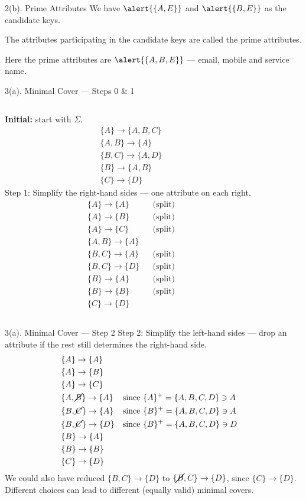 \documentclass{beamer}
\newcommand\fd[2]{\{#1\} \rightarrow \{#2\}}
\newcommand\cl[1]{\{#1\}^+}
\begin{document}
\begin{frame}{2(b). Prime Attributes}
\vfill
We have $\alert{\{A,E\}}$ and $\alert{\{B,E\}}$ as the \alert{candidate keys}.
\bigskip

\pause
The attributes participating in the candidate keys are called the \alert{prime attributes}.
\bigskip

\pause
Here the prime attributes are $\alert{\{A, B, E\}}$ --- email, mobile and service name.
\vfill
\end{frame}

\begin{frame}{3(a). Minimal Cover --- Steps 0 \& 1}
\small
\begin{columns}[t,onlytextwidth]
\textbf{Initial:} start with $\Sigma$.
\[
\begin{aligned}
&\fd{A}{A,B,C}\\
&\fd{A,B}{A}\\
&\fd{B,C}{A,D}\\
&\fd{B}{A,B}\\
&\fd{C}{D}
\end{aligned}
\]
\pause
{}
\alert{Step 1: Simplify the right-hand sides} --- one attribute on each right.
\[
\begin{aligned}
&\fd{A}{A} && \text{(split)}\\
&\fd{A}{B} && \text{(split)}\\
&\fd{A}{C} && \text{(split)}\\
&\fd{A,B}{A}\\
&\fd{B,C}{A} && \text{(split)}\\
&\fd{B,C}{D} && \text{(split)}\\
&\fd{B}{A} && \text{(split)}\\
&\fd{B}{B} && \text{(split)}\\
&\fd{C}{D}
\end{aligned}
\]
\end{columns}
\end{frame}

\begin{frame}{3(a). Minimal Cover --- Step 2}
\small
\alert{Step 2: Simplify the left-hand sides} --- drop an attribute if the rest still determines the right-hand side.
\[
\begin{aligned}
&\fd{A}{A}\\
&\fd{A}{B}\\
&\fd{A}{C}\\
&\{A, \cancel{B}\} \rightarrow \{A\} && \text{since } \cl{A} = \{A,B,C,D\} \ni A\\
&\{B, \cancel{C}\} \rightarrow \{A\} && \text{since } \cl{B} = \{A,B,C,D\} \ni A\\
&\{B, \cancel{C}\} \rightarrow \{D\} && \text{since } \cl{B} = \{A,B,C,D\} \ni D\\
&\fd{B}{A}\\
&\fd{B}{B}\\
&\fd{C}{D}
\end{aligned}
\]
\footnotesize
We could also have reduced $\{B,C\} \rightarrow \{D\}$ to $\{\cancel{B}, C\} \rightarrow \{D\}$, since $\fd{C}{D}$. Different choices can lead to different (equally valid) minimal covers.
\end{frame}
\end{document}
